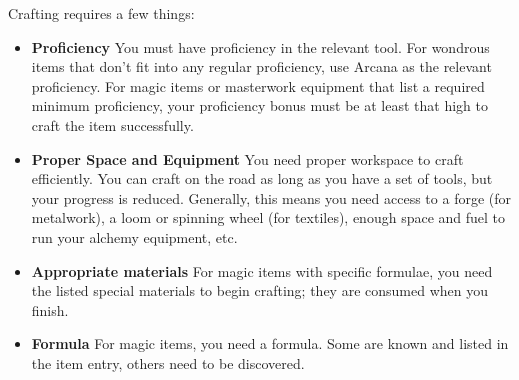 Crafting requires a few things:
\begin{itemize}
\item \textbf{Proficiency} You must have proficiency in the relevant tool. For wondrous items that don't fit into any regular proficiency, use Arcana as the relevant proficiency. For magic items or masterwork equipment that list a required minimum proficiency, your proficiency bonus must be at least that high to craft the item successfully.
\item \textbf{Proper Space and Equipment} You need proper workspace to craft efficiently. You can craft on the road as long as you have a set of tools, but your progress is reduced. Generally, this means you need access to a forge (for metalwork), a loom or spinning wheel (for textiles), enough space and fuel to run your alchemy equipment, etc.
\item \textbf{Appropriate materials} For magic items with specific formulae, you need the listed special materials to begin crafting; they are consumed when you finish.
\item \textbf{Formula} For magic items, you need a formula. Some are known and listed in the item entry, others need to be discovered.
\end{itemize}

